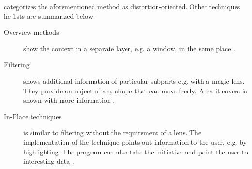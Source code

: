 \citeauthor{Kosara2003} categorizes the aforementioned method as distortion-oriented. Other techniques he lists are summarized below:
\begin{description}
\item[Overview methods] show the context in a separate layer, e.g. a window, in the same place .
\item[Filtering] shows additional information of particular subparts e.g. with a magic lens. They provide an object of any shape that can move freely. Area it covers is shown with more information .
\item[In-Place techniques] is similar to filtering without the requirement of a lens. The implementation of the technique points out information to the user, e.g. by highlighting. The program can also take the initiative and point the user to interesting data .
\end{description}
